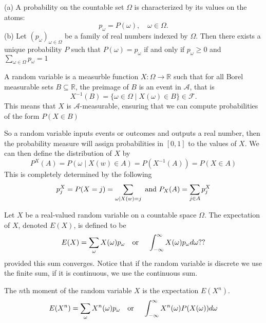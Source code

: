 \documentclass[../main.tex]{subfiles}
\begin{document}
\begin{theorem}
(a) A probability on the countable set $\Omega$ is characterized by its values on the atoms: 
\[
p_\omega = P({\omega}), \quad \omega \in \Omega.
\]
(b) Let $(p_\omega)_{\omega \in \Omega}$ be a family of real numbers indexed by $\Omega$.
Then there exists a unique probability $P$ such that $P({\omega}) = p_\omega$ if and only if $p_\omega \geq 0$ and $\sum_{\omega \in \Omega}{p_\omega} = 1$
\end{theorem}


\begin{definition} \label{def: Random_Variable}
A random variable is a measurble function $ X: \Omega \to \mathbb{R}$ such that for all Borel measurable sets $ B \subseteq \mathbb{R}$,
the preimage of $B$ is an event in $\mathcal{A}$, that is 
\[
X^{-1}(B) = \{ \omega \in \Omega \mid X(\omega) \in B \} \in \mathcal{F}.
\]
This means that $X$ is $\mathcal{A}$-measurable, ensuring that we can compute probabilities of the form $P(X \in B)$
\end{definition}


\begin{remark}
So a random variable inputs events or outcomes and outputs a real number, then the probability measure will assign probabilities in $[0,1]$ to the values of $X$.
We can then define the distribution of $X$ by
\[
P^X(A) = P({\omega \mid X(w) \in A}) = P(X^{-1}(A)) = P(X \in A)
\]
This is completely determined by the following 
\[
p_j^X = P(X=j) = \sum_{\omega \mid X(w) =j} \textnormal{ and } P_X(A) = \sum_{j \in A}{p^X_j}
\]
\end{remark}

\begin{definition}
Let $X$ be a real-valued random variable on a countable space $\Omega$. The expectation of $X$, denoted $E(X)$, is defined to be 
\[
E(X) = \sum_{\omega}{X(\omega)p_\omega} \quad \textnormal{or } \quad \int_{-\infty}^{\infty}X(\omega)p_\omega d\omega??
\]
provided this sum converges. Notice that if the random variable is discrete we use the finite sum, if it is continuous, we use the continuous sum.
\end{definition}

\begin{definition}
The $n$th moment of the random variable $X$ is the expectation $E(X^n)$. 
\[
E(X^n) = \sum_{\omega}{X^n(\omega)p_\omega} \quad \textnormal{or } \quad \int_{-\infty}^{\infty}X^n(\omega)P(X(\omega)) d\omega
\]
\end{definition}
\end{document}
